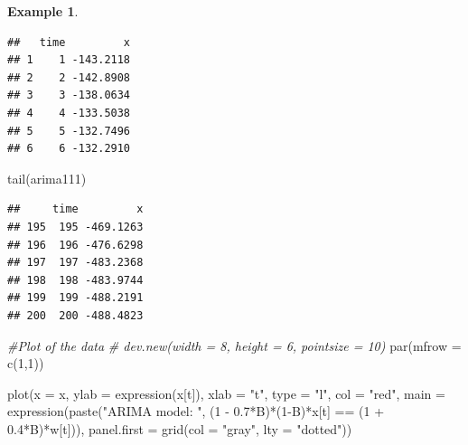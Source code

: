 \documentclass[
]{book}
\newenvironment{Shaded}{\begin{snugshade}}{\end{snugshade}}
\newcommand{\AttributeTok}[1]{\textcolor[rgb]{0.77,0.63,0.00}{#1}}
\newcommand{\CommentTok}[1]{\textcolor[rgb]{0.56,0.35,0.01}{\textit{#1}}}
\newcommand{\DecValTok}[1]{\textcolor[rgb]{0.00,0.00,0.81}{#1}}
\newcommand{\FloatTok}[1]{\textcolor[rgb]{0.00,0.00,0.81}{#1}}
\newcommand{\FunctionTok}[1]{\textcolor[rgb]{0.00,0.00,0.00}{#1}}
\newcommand{\NormalTok}[1]{#1}
\newcommand{\OtherTok}[1]{\textcolor[rgb]{0.56,0.35,0.01}{#1}}
\newcommand{\SpecialCharTok}[1]{\textcolor[rgb]{0.00,0.00,0.00}{#1}}
\newcommand{\StringTok}[1]{\textcolor[rgb]{0.31,0.60,0.02}{#1}}
\theoremstyle{definition}
\theoremstyle{definition}
\newtheorem{example}{Example}[chapter]
\theoremstyle{definition}
\theoremstyle{definition}
\theoremstyle{remark}
\begin{document}
\begin{example}
\begin{verbatim}
##   time         x
## 1    1 -143.2118
## 2    2 -142.8908
## 3    3 -138.0634
## 4    4 -133.5038
## 5    5 -132.7496
## 6    6 -132.2910
\end{verbatim}

\begin{Shaded}
\begin{Highlighting}[]
\FunctionTok{tail}\NormalTok{(arima111)}
\end{Highlighting}
\end{Shaded}

\begin{verbatim}
##     time         x
## 195  195 -469.1263
## 196  196 -476.6298
## 197  197 -483.2368
## 198  198 -483.9744
## 199  199 -488.2191
## 200  200 -488.4823
\end{verbatim}

\begin{Shaded}
\end{Shaded}

\begin{Shaded}
\begin{Highlighting}[]
\CommentTok{\#Plot of the data}
\CommentTok{\# dev.new(width = 8, height = 6, pointsize = 10)  }
\FunctionTok{par}\NormalTok{(}\AttributeTok{mfrow =} \FunctionTok{c}\NormalTok{(}\DecValTok{1}\NormalTok{,}\DecValTok{1}\NormalTok{))}

\FunctionTok{plot}\NormalTok{(}\AttributeTok{x =}\NormalTok{ x, }\AttributeTok{ylab =} \FunctionTok{expression}\NormalTok{(x[t]), }\AttributeTok{xlab =} \StringTok{"t"}\NormalTok{, }\AttributeTok{type =} 
   \StringTok{"l"}\NormalTok{, }\AttributeTok{col =} \StringTok{"red"}\NormalTok{, }\AttributeTok{main =} \FunctionTok{expression}\NormalTok{(}\FunctionTok{paste}\NormalTok{(}\StringTok{"ARIMA }
\StringTok{   model: "}\NormalTok{, (}\DecValTok{1} \SpecialCharTok{{-}} \FloatTok{0.7}\SpecialCharTok{*}\NormalTok{B)}\SpecialCharTok{*}\NormalTok{(}\DecValTok{1}\SpecialCharTok{{-}}\NormalTok{B)}\SpecialCharTok{*}\NormalTok{x[t] }\SpecialCharTok{==}\NormalTok{ (}\DecValTok{1} \SpecialCharTok{+} \FloatTok{0.4}\SpecialCharTok{*}\NormalTok{B)}\SpecialCharTok{*}\NormalTok{w[t])), }
   \AttributeTok{panel.first =} \FunctionTok{grid}\NormalTok{(}\AttributeTok{col =} \StringTok{"gray"}\NormalTok{, }\AttributeTok{lty =} \StringTok{"dotted"}\NormalTok{))}
\end{Highlighting}
\end{Shaded}


\end{example}
\end{document}
